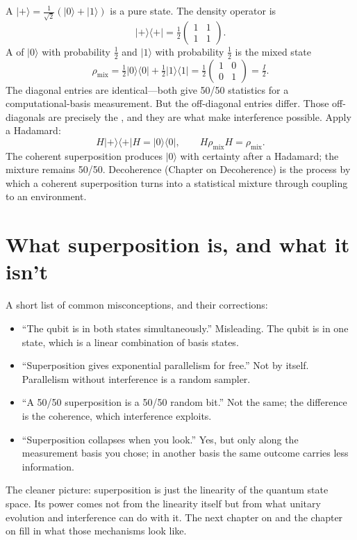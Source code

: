A  $|+\rangle = \tfrac{1}{\sqrt 2}(|0\rangle + |1\rangle)$ is a pure state. The density operator is
\[
  |+\rangle\langle+| = \tfrac{1}{2}\begin{pmatrix}1 & 1 \\ 1 & 1\end{pmatrix}.
\]
A  of $|0\rangle$ with probability $\tfrac12$ and $|1\rangle$ with probability $\tfrac12$ is the mixed state
\[
  \rho_{\mathrm{mix}} = \tfrac{1}{2}|0\rangle\langle 0| + \tfrac{1}{2}|1\rangle\langle 1| = \tfrac{1}{2}\begin{pmatrix}1 & 0 \\ 0 & 1\end{pmatrix} = \tfrac{I}{2}.
\]
The diagonal entries are identical---both give 50/50 statistics for a computational-basis measurement. But the off-diagonal entries differ. Those off-diagonals are precisely the , and they are what make interference possible. Apply a Hadamard:
\[
  H|+\rangle\langle+|H = |0\rangle\langle 0|, \qquad H\rho_{\mathrm{mix}}H = \rho_{\mathrm{mix}}.
\]
The coherent superposition produces $|0\rangle$ with certainty after a Hadamard; the mixture remains 50/50. Decoherence (Chapter on Decoherence) is the process by which a coherent superposition turns into a statistical mixture through coupling to an environment.

\section{What superposition is, and what it isn't}

A short list of common misconceptions, and their corrections:

\begin{itemize}
  \item ``The qubit is in both states simultaneously.'' Misleading. The qubit is in one state, which is a linear combination of basis states.
  \item ``Superposition gives exponential parallelism for free.'' Not by itself. Parallelism without interference is a random sampler.
  \item ``A 50/50 superposition is a 50/50 random bit.'' Not the same; the difference is the coherence, which interference exploits.
  \item ``Superposition collapses when you look.'' Yes, but only along the measurement basis you chose; in another basis the same outcome carries less information.
\end{itemize}

The cleaner picture: superposition is just the linearity of the quantum state space. Its power comes not from the linearity itself but from what unitary evolution and interference can do with it. The next chapter on  and the chapter on  fill in what those mechanisms look like.

\textsep
